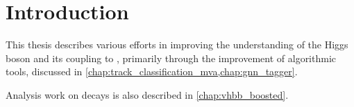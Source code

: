 \chapter{Introduction}\label{chap:intro}


This thesis describes various efforts in improving the understanding of the Higgs boson and its coupling to \bcquarks, primarily through the improvement of algorithmic tools, discussed in \cref{chap:track_classification_mva,chap:gnn_tagger}.

Analysis work on \Hbb decays is also described in \cref{chap:vhbb_boosted}.



